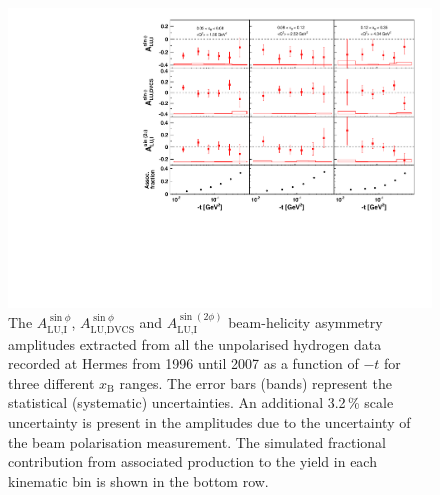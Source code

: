 \documentclass[11pt,a4paper]{article}
\begin{document}
\begin{figure}
 \begin{center}
 \includegraphics[width=15cm]{bsa_2D}
  \caption{The $A_{\textrm{LU,I}}^{\sin\phi}$, $A_{\textrm{LU,DVCS}}^{\sin\phi}$ and
$A_{\textrm{LU,I}}^{\sin(2\phi)}$ beam-helicity asymmetry amplitudes
extracted from all the unpolarised hydrogen data recorded at H{\sc ermes} from 1996 until 2007 as a function of $-t$ for three different $x_{\textrm{B}}$ ranges. The error bars (bands) represent the statistical (systematic) uncertainties. An additional 3.2\,\% scale uncertainty is present in the amplitudes due to the uncertainty of the beam polarisation measurement. The simulated fractional contribution from associated production to the yield in each kinematic bin is shown in the bottom row.}
  \label{bsa_xbjrange2}
 \end{center}
\end{figure}
\end{document}
